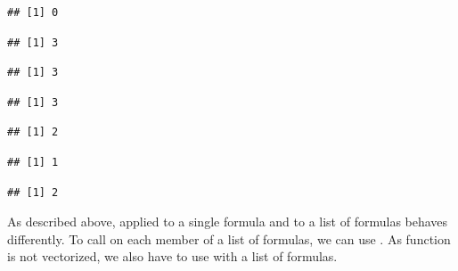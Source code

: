 \documentclass[krantz2]{krantz}\usepackage{knitr}
\begin{document}
\begin{explainbox}
\begin{knitrout}\footnotesize
{}\color{fgcolor}\begin{kframe}
\begin{alltt}
\hlstd{(}\hlstd{())}
\end{alltt}
\begin{verbatim}
## [1] 0
\end{verbatim}
\begin{alltt}
 \hlopt{~} \hlstd{)}
\end{alltt}
\begin{verbatim}
## [1] 3
\end{verbatim}
\begin{alltt}
 \hlopt{~} \hlstd{)}
\end{alltt}
\begin{verbatim}
## [1] 3
\end{verbatim}
\begin{alltt}
 \hlopt{~} 
\end{alltt}
\begin{verbatim}
## [1] 3
\end{verbatim}
\begin{alltt}
\hlstd{(} \hlopt{~}  \hlopt{~} 
\end{alltt}
\begin{verbatim}
## [1] 2
\end{verbatim}
\begin{alltt}
\hlstd{(} \hlopt{~} \hlstd{))}
\end{alltt}
\begin{verbatim}
## [1] 1
\end{verbatim}
\begin{alltt}
\hlstd{(} \hlopt{~}  \hlopt{~} 
\end{alltt}
\begin{verbatim}
## [1] 2
\end{verbatim}
\end{kframe}
\end{knitrout}

As described above,  applied to a single formula and to a list of formulas behaves differently. To call  on each member of a list of formulas, we can use . As function  is not vectorized, we also have to use  with a list of formulas.


\end{explainbox}
\end{document}
